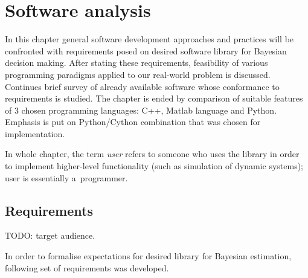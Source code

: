 \chapter{Software analysis}

In this chapter general software development approaches and practices will be confronted with
requirements posed on desired software library for Bayesian decision making. After stating these
requirements, feasibility of various programming paradigms applied to our real-world problem is
discussed. Continues brief survey of already available software whose conformance to requirements
is studied. The chapter is ended by comparison of suitable features of 3 chosen programming
languages: C++, Matlab language and Python. Emphasis is put on Python/Cython combination that was
chosen for implementation.

In whole chapter, the term \emph{user} refers to someone who uses the library in order to implement
higher-level functionality (such as simulation of dynamic systems); user is essentially
a~programmer.

\section{Requirements}

TODO: target audience. %

In order to formalise expectations for desired library for Bayesian estimation, following set of
requirements was developed.

